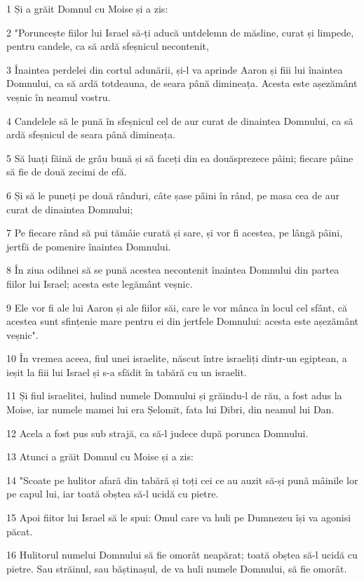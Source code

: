 \par 1 Și a grăit Domnul cu Moise și a zis:
\par 2 "Poruncește fiilor lui Israel să-ți aducă untdelemn de măsline, curat și limpede, pentru candele, ca să ardă sfeșnicul necontenit,
\par 3 Înaintea perdelei din cortul adunării, și-l va aprinde Aaron și fiii lui înaintea Domnului, ca să ardă totdeauna, de seara până dimineața. Acesta este așezământ veșnic în neamul vostru.
\par 4 Candelele să le pună în sfeșnicul cel de aur curat de dinaintea Domnului, ca să ardă sfeșnicul de seara până dimineața.
\par 5 Să luați făină de grâu bună și să faceți din ea douăsprezece pâini; fiecare pâine să fie de două zecimi de efă.
\par 6 Și să le puneți pe două rânduri, câte șase pâini în rând, pe masa cea de aur curat de dinaintea Domnului;
\par 7 Pe fiecare rând să pui tămâie curată și sare, și vor fi acestea, pe lângă pâini, jertfă de pomenire înaintea Domnului.
\par 8 În ziua odihnei să se pună acestea necontenit înaintea Domnului din partea fiilor lui Israel; acesta este legământ veșnic.
\par 9 Ele vor fi ale lui Aaron și ale fiilor săi, care le vor mânca în locul cel sfânt, că acestea sunt sfințenie mare pentru ei din jertfele Domnului: acesta este așezământ veșnic".
\par 10 În vremea aceea, fiul unei israelite, născut între israeliți dintr-un egiptean, a ieșit la fiii lui Israel și s-a sfădit în tabără cu un israelit.
\par 11 Și fiul israelitei, hulind numele Domnului și grăindu-l de rău, a fost adus la Moise, iar numele mamei lui era Șelomit, fata lui Dibri, din neamul lui Dan.
\par 12 Acela a fost pus sub strajă, ca să-l judece după porunca Domnului.
\par 13 Atunci a grăit Domnul cu Moise și a zis:
\par 14 "Scoate pe hulitor afară din tabără și toți cei ce au auzit să-și pună mâinile lor pe capul lui, iar toată obștea să-l ucidă cu pietre.
\par 15 Apoi fiitor lui Israel să le spui: Omul care va huli pe Dumnezeu își va agonisi păcat.
\par 16 Hulitorul numelui Domnului să fie omorât neapărat; toată obștea să-l ucidă cu pietre. Sau străinul, sau băștinașul, de va huli numele Domnului, să fie omorât.
